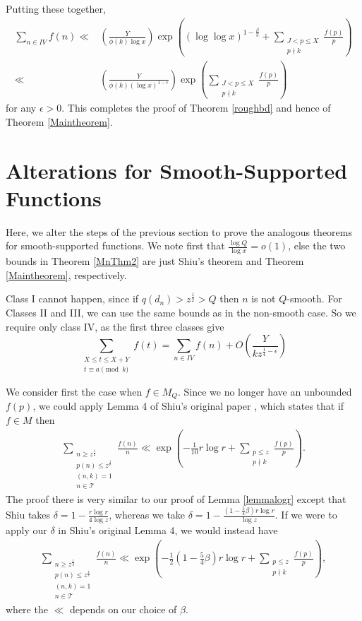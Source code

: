 \documentclass{amsart}
\begin{document}
Putting these together,
\begin{align*}\sum_{n\in IV}f(n)\ll & \left(\frac{Y}{\phi(k)\log x}\right)\exp\left((\log\log x)^{1-\frac{\beta}{3}}+\sum_{\substack{J<p\leq X \\ p\nmid k}}\frac{f(p)}{p}\right)\\
\ll & \left(\frac{Y}{\phi(k)(\log x)^{1-\epsilon}}\right)\exp\left(\sum_{\substack{J<p\leq X \\ p\nmid k}}\frac{f(p)}{p}\right)
\end{align*}
for any $\epsilon>0$.  This completes the proof of Theorem \ref{roughbd} and hence of Theorem \ref{Maintheorem}.



\section{Alterations for Smooth-Supported Functions}

Here, we alter the steps of the previous section to prove the analogous theorems for smooth-supported functions.  We note first that $\frac{\log Q}{\log x}=o(1)$, else the two bounds in Theorem \ref{MnThm2} are just Shiu's theorem and Theorem \ref{Maintheorem}, respectively.

Class I cannot happen, since if $q(d_n)>z^\frac 12>Q$ then $n$ is not $Q$-smooth.  For Classes II and III, we can use the same bounds as in the non-smooth case.  So we require only class IV, as the first three classes give
$$\sum_{\substack{X\leq t\leq X+Y \\ t\equiv a\pmod k}}f(t)=\sum_{n\in IV}f(n)+O\left(\frac{Y}{kz^{\frac 14-\epsilon}}\right)$$

We consider first the case when $f\in M_Q$.  Since we no longer have an unbounded $f(p)$, we could apply Lemma 4 of Shiu's original paper \cite{Sh}, which states that if $f\in M$ then
\begin{gather}\label{Shlem}\sum_{\substack{n\geq z^\frac 12 \\ p(n)\leq z^\frac 1r \\ (n,k)=1 \\ n\in \mathcal T}}\frac{f(n)}{n}\ll \exp\left(-\frac{1}{10}r\log r+\sum_{\substack{p\leq z \\ p\nmid k}}\frac{f(p)}{p}\right).
\end{gather}
The proof there is very similar to our proof of Lemma \ref{lemmalogr} except that Shiu takes $\delta=1-\frac{r\log r}{4\log z}$, whereas we take $\delta=1-\frac{(1-\frac 54\beta )r\log r}{\log z}$.  If we were to apply our $\delta$ in Shiu's original Lemma 4, we would instead have
\begin{gather}\label{Shlem4}\sum_{\substack{n\geq z^\frac 12 \\ p(n)\leq z^\frac 1r \\ (n,k)=1 \\ n\in \mathcal T}}\frac{f(n)}{n}\ll \exp\left(-\frac 12\left(1-\frac 54\beta\right)r\log r+\sum_{\substack{p\leq z \\ p\nmid k}}\frac{f(p)}{p}\right),
\end{gather}
where the $\ll$ depends on our choice of $\beta$.
\end{document}

